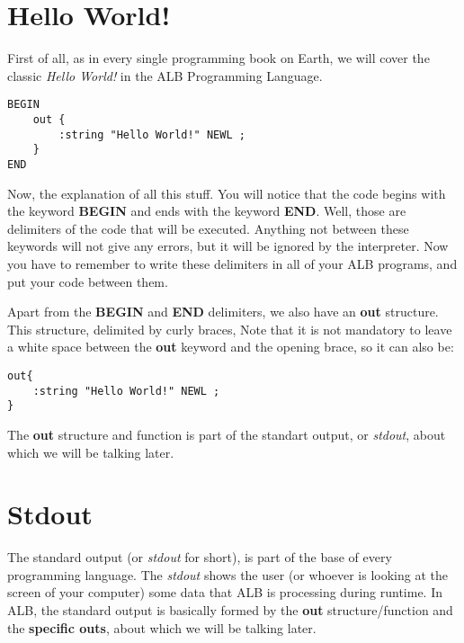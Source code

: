 \documentclass[12pt]{book}
\begin{document}
\section{Hello World!}

First of all, as in every single programming book on Earth, we will cover the classic \textit{Hello World!} in the ALB Programming Language.\bigskip
\begin{lstlisting}
BEGIN
	out {
		:string "Hello World!" NEWL ;
	}
END
\end{lstlisting}
\bigskip
Now, the explanation of all this stuff. You will notice that the code begins with the keyword \textbf{BEGIN} and ends with the keyword \textbf{END}. Well, those are delimiters of the code that will be executed. Anything not between these keywords will not give any errors, but it will be ignored by the interpreter. Now you have to remember to write these delimiters in all of your ALB programs, and put your code between them.\\
\bigskip

Apart from the \textbf{BEGIN} and \textbf{END} delimiters, we also have an \textbf{out} structure. This structure, delimited by curly braces, Note that it is not mandatory to leave a white space between the \textbf{out} keyword and the opening brace, so it can also be:
\bigskip
\begin{lstlisting}
out{
	:string "Hello World!" NEWL ;
}
\end{lstlisting}
\bigskip
The \textbf{out} structure and function is part of the standart output, or \textit{stdout}, about which we will be talking later.

\section{Stdout}
The standard output (or \textit{stdout} for short), is part of the base of every programming language. The \textit{stdout} shows the user (or whoever is looking at the screen of your computer) some data that ALB is processing during runtime. In ALB, the standard output is basically formed by the \textbf{out} structure/function and the \textbf{specific outs}, about which we will be talking later.
\end{document}

